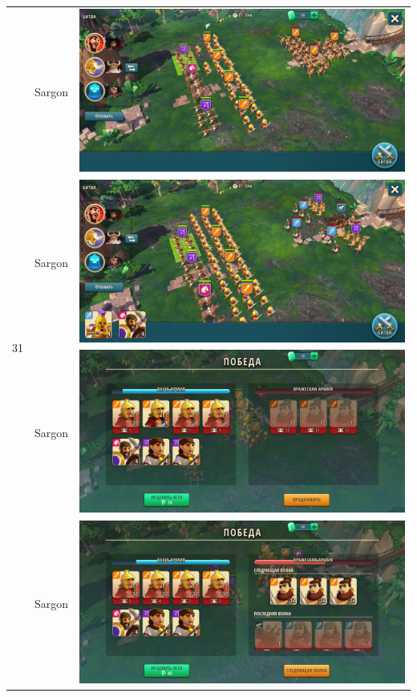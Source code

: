 \begin{longtable}{|c|c|c|}
    \hline
    \multirow{8}{*}{31} & Sargon &
    \includegraphics[width=0.75\linewidth]{./parts/media/TreasureHunt/31/sargon/photo_2022-04-07_10-05-22.jpg} \\
    & Sargon &
    \includegraphics[width=0.75\linewidth]{./parts/media/TreasureHunt/31/sargon/photo_2022-04-07_10-05-08.jpg} \\
    & Sargon &
    \includegraphics[width=0.75\linewidth]{./parts/media/TreasureHunt/31/sargon/photo_2022-04-07_10-05-25.jpg} \\
    & Sargon &
    \includegraphics[width=0.75\linewidth]{./parts/media/TreasureHunt/31/sargon/photo_2022-04-07_10-05-18.jpg} \\

\end{longtable}
